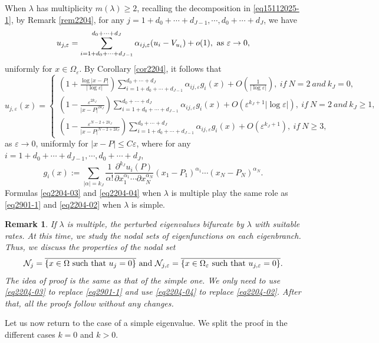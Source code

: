 \documentclass[11pt,reqno]{article}
\newtheorem{rem}[teo]{Remark}
\numberwithin{equation}{section}
\newcommand\e\varepsilon
\newcommand\la\lambda
\renewcommand\O\Omega
\begin{document}
 When $\lambda$ has multiplicity $m(\lambda)\ge2$, recalling the decomposition in \eqref{eq15112025-1}, by Remark \ref{rem2204}, for any $j=1+d_0+\cdots+d_{J-1},\cdots,d_0+\cdots+d_J$, we have 
  \begin{equation}\label{eq2204-03}
        u_{j,\e}=\sum_{i=1+d_0+\cdots+d_{J-1}}^{d_0+\cdots+d_J}\alpha_{ij,\e}(u_i-V_{u_i})+o(1), \hbox{ as } \e\to 0,
    \end{equation}
  uniformly for $x\in\O_\e$. By Corollary \ref{cor2204}, it follows that 
\begin{equation}\label{eq2204-04}
    u_{j,\e}(x)=\begin{cases}
              \displaystyle\left  (1+\frac{\log |x-P|}{|\log\e|}\right)\sum_{i=1+d_0+\cdots+d_{J-1}}^{d_0+\cdots+d_J}\alpha_{ij,\e}g_i(x)
              +O\left(\frac{1}{|\log\e|}\right),\  if \ N=2  \ and\ k_J=0,\\
				 \displaystyle \left(1-\frac{\e^{2k_J}}{|x-P|^{2k_J}}\right)\sum_{i=1+d_0+\cdots+d_{J-1}}^{d_0+\cdots+d_J}\alpha_{ij,\e}g_i(x)+O(\e^{k_J+1}|\log\e|),\  if  \ N=2  \ and\ k_J\ge1,\\
                 \displaystyle   \left(1-\frac{\e^{N-2+2k_J}}{|x-P|^{N-2+2k_J}}
				\right)\sum_{i=1+d_0+\cdots+d_{J-1}}^{d_0+\cdots+d_J}\alpha_{ij,\e}g_i(x)+O(\e^{k_J+1}), \ if\ N\ge 3,
                \end{cases} 
\end{equation}
as $\e\to 0$, uniformly for $|x-P|\leq C\e$, where for any $i=1+d_0+\cdots+d_{J-1},\cdots,d_0+\cdots+d_J$,
     $$
   g_i(x):= \sum_{|\alpha|=k_J}\frac1{\alpha!}
					\frac{\partial^{k_J}u_i(P)}{\partial x_1^{\alpha_1}\cdots\partial x_N^{\alpha_N}}(x_1-P_1)^{\alpha_1}\cdots(x_N-P_N)^{\alpha_N}.
    $$
Formulas \eqref{eq2204-03} and \eqref{eq2204-04} when $\lambda$ is multiple play the same role as \eqref{eq2901-1} and \eqref{eq2204-02} when $\lambda$ is simple. 

 \begin{rem}
    If $\lambda$ is multiple, the perturbed eigenvalues bifurcate by $\la$ with suitable rates. At this time, we study the nodal sets of eigenfunctions on each eigenbranch. Thus,
    we discuss the properties of the nodal set    $$\mathcal{N}_{j}=\overline{\{x\in\O\hbox{ such that }u_{j}=0\}}\hbox{ and } \mathcal{N}_{j,\e}=\overline{\{x\in\O_\e\hbox{ such that }u_{j,\e}=0\}}.$$
    The idea of proof is the same as that of the simple one. We only need to use \eqref{eq2204-03} to replace \eqref{eq2901-1} and use \eqref{eq2204-04} to replace \eqref{eq2204-02}. 
     After that, all the proofs follow without any changes.
\end{rem}
 Let us now return to the case of a simple eigenvalue.	We split the proof in the different cases $k=0$ and $k>0$.
	\vskip0.2cm
\end{document}
